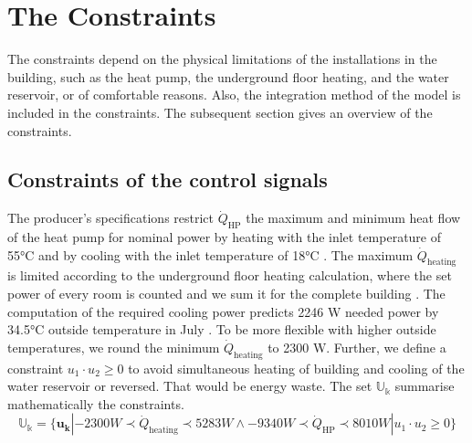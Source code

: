 \section{The Constraints}
\label{section:theconstraints}

The constraints depend on the physical limitations of the installations in the building, such as the heat pump, the underground floor heating, and the water reservoir, or of comfortable reasons. Also, the integration method of the model is included in the constraints. The subsequent section gives an overview of the constraints.

\subsection{Constraints of the control signals}
\label{subsec:COnstraintU}
The producer's specifications restrict $\dot{Q}_\text{HP}$ the maximum and minimum heat flow of the heat pump for nominal power by heating with the inlet temperature of 55°C and by cooling with the inlet temperature of 18°C \cite{TUM}. The maximum $\dot{Q}_\text{heating}$  is limited according to the underground floor heating calculation, where the set power of every room is counted and we sum it for the complete building \cite{Roth_Auslegung.2020}. The computation of the required cooling power predicts 2246 W needed power by 34.5°C outside temperature in July \cite{SEFIngenieurgesellschaftMBH.2019}. To be more flexible with higher outside temperatures, we round the minimum $\dot{Q}_\text{heating}$ to 2300 W.\newline
Further, we define a constraint $u_1 \cdot u_2 \geq 0$ to avoid simultaneous heating of building and cooling of the water reservoir or reversed. That would be energy waste.
The set $\mathbb{U_k}$ summarise mathematically the constraints.
\begin{equation}
    \label{ConstraintU}
    \mathbb{U_k} = \{\mathbf{u_k}| -2300 W \prec \dot{Q}_\text{heating} \prec 5283 W \wedge -9340 W \prec \dot{Q}_\text{HP} \prec 8010 W | u_1 \cdot u_2 \geq 0\} 
\end{equation}

